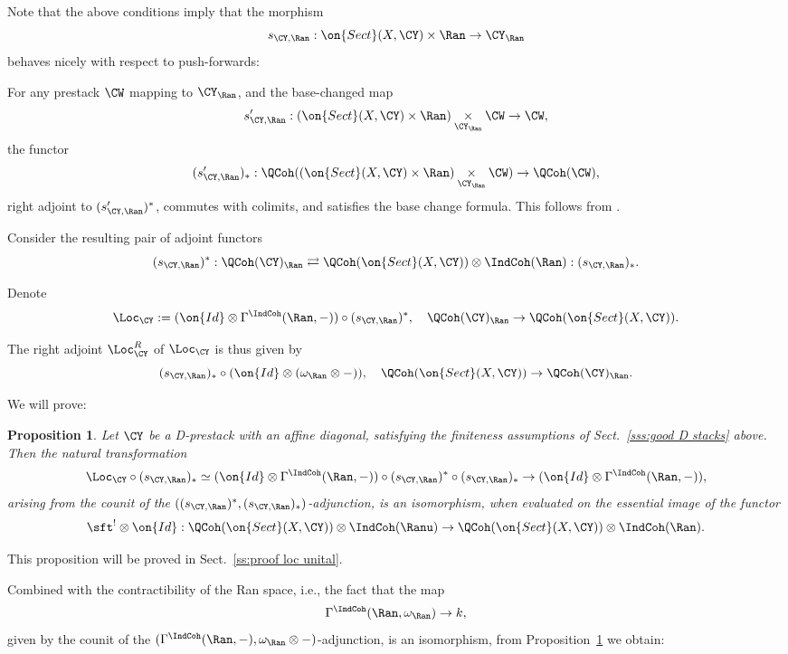 \documentclass[9pt]{amsart}
\newtheorem{prop}[subsubsection]{Proposition}
\theoremstyle{remark}
\theoremstyle{definition}
\theoremstyle{remark}
\newcommand{\secref}[1]{Sect.~\ref{#1}}
\newcommand{\propref}[1]{Proposition~\ref{#1}}
\numberwithin{equation}{section}
\begin{document}
\sssec{}

Note that the above conditions imply that the morphism 
$$s_{\CY,\Ran}:\on{Sect}(X,\CY)\times \Ran\to \CY_\Ran$$
behaves nicely with respect to push-forwards:

\medskip

For any prestack $\CW$ mapping to $\CY_\Ran$, and the base-changed map 
$$s'_{\CY,\Ran}:(\on{Sect}(X,\CY)\times \Ran)\underset{\CY_\Ran}\times \CW\to \CW,$$
the functor 
$$(s'_{\CY,\Ran})_*:\QCoh((\on{Sect}(X,\CY)\times \Ran)\underset{\CY_\Ran}\times \CW)\to \QCoh(\CW),$$
right adjoint to $(s'_{\CY,\Ran})^*$, commutes with colimits,
and satisfies the base change formula. This follows from \cite[Chapter 3, Proposition 3.5.3]{GaRo2}. 

\sssec{}

Consider the resulting pair of adjoint functors
$$(s_{\CY,\Ran})^*:\QCoh(\CY)_\Ran\rightleftarrows \QCoh(\on{Sect}(X,\CY))\otimes \IndCoh(\Ran):(s_{\CY,\Ran})_*.$$

\medskip

Denote
$$\Loc_\CY:=(\on{Id}\otimes \Gamma^{\IndCoh}(\Ran,-))\circ (s_{\CY,\Ran})^*, \quad \QCoh(\CY)_\Ran\to \QCoh(\on{Sect}(X,\CY)).$$

The right adjoint $\Loc_\CY^R$ of $\Loc_\CY$ is thus given by
$$(s_{\CY,\Ran})_*\circ (\on{Id}\otimes (\omega_\Ran\otimes -)), \quad \QCoh(\on{Sect}(X,\CY))\to \QCoh(\CY)_\Ran.$$

\sssec{}

We will prove:

\begin{prop} \label{p:loc unital}
Let $\CY$ be a D-prestack with an affine diagonal, satisfying the finiteness assumptions of \secref{sss:good D stacks} above. 
Then the natural transformation
$$\Loc_\CY\circ (s_{\CY,\Ran})_*\simeq 
(\on{Id}\otimes \Gamma^{\IndCoh}(\Ran,-))\circ (s_{\CY,\Ran})^*\circ (s_{\CY,\Ran})_*\to (\on{Id}\otimes \Gamma^{\IndCoh}(\Ran,-)),$$
arising from the counit of the $((s_{\CY,\Ran})^*,(s_{\CY,\Ran})_*)$-adjunction, is an isomorphism, when evaluated on the essential image of 
the functor 
$$\sft^!\otimes \on{Id}:\QCoh(\on{Sect}(X,\CY))\otimes \IndCoh(\Ranu)\to \QCoh(\on{Sect}(X,\CY))\otimes \IndCoh(\Ran).$$
\end{prop} 

This proposition will be proved in \secref{ss:proof loc unital}.

\sssec{}

Combined with the contractibility of the Ran space, i.e., the fact that the map
$$\Gamma^{\IndCoh}(\Ran,\omega_\Ran)\to k,$$
given by the counit of the $(\Gamma^{\IndCoh}(\Ran,-),\omega_\Ran\otimes -)$-adjunction, 
is an isomorphism, from \propref{p:loc unital} we obtain:
\end{document}
